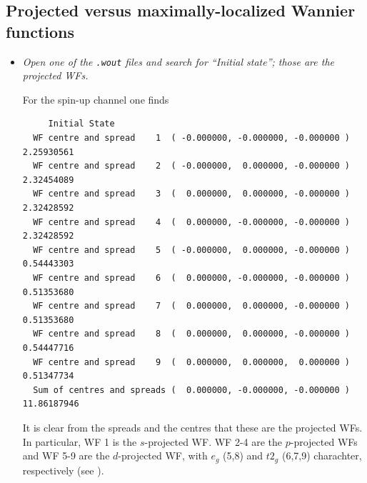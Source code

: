 \subsection*{Projected versus maximally-localized Wannier functions}
\begin{itemize}
	\item {\it Open one of the {\tt .wout} files and search for ``Initial state''; those are the projected WFs.}

	For the spin-up channel one finds
	  \begin{tcolorbox}[sharp corners,boxrule=0.5pt]
  {\small
	\begin{verbatim}
	 Initial State
  WF centre and spread    1  ( -0.000000, -0.000000, -0.000000 )     2.25930561
  WF centre and spread    2  ( -0.000000,  0.000000, -0.000000 )     2.32454089
  WF centre and spread    3  (  0.000000,  0.000000, -0.000000 )     2.32428592
  WF centre and spread    4  (  0.000000, -0.000000, -0.000000 )     2.32428592
  WF centre and spread    5  ( -0.000000,  0.000000, -0.000000 )     0.54443303
  WF centre and spread    6  (  0.000000, -0.000000, -0.000000 )     0.51353680
  WF centre and spread    7  (  0.000000,  0.000000, -0.000000 )     0.51353680
  WF centre and spread    8  (  0.000000,  0.000000, -0.000000 )     0.54447716
  WF centre and spread    9  (  0.000000,  0.000000,  0.000000 )     0.51347734
  Sum of centres and spreads (  0.000000, -0.000000, -0.000000 )    11.86187946
	\end{verbatim}
	}
	\end{tcolorbox}
	It is clear from the spreads and the centres that these are the projected WFs. In particular, WF 1 is the $s$-projected WF. WF 2-4 are the $p$-projected WFs and WF 5-9 are the $d$-projected WF, with $e_g$ (5,8) and $t2_g$ (6,7,9) charachter, respectively (see ).
	\begin{figure}[h!]
	\centering

\end{figure}
\end{itemize}
